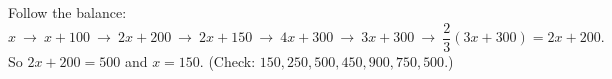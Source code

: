 Follow the balance:
\[
x\ \to\ x+100\ \to\ 2x+200\ \to\ 2x+150\ \to\ 4x+300\ \to\ 3x+300\ \to\ \dfrac{2}{3}(3x+300)=2x+200 .
\]
So $2x+200=500$ and $x=\boxed{150}$. (Check: $150,250,500,450,900,750,500$.)
